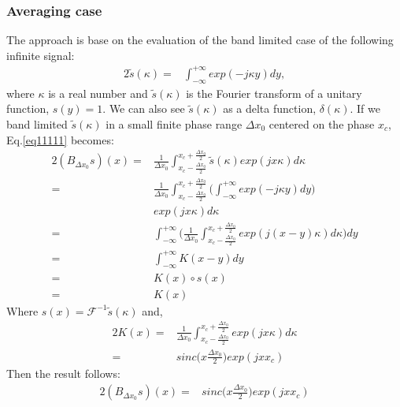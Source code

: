 \subsubsection{Averaging case}
The approach is base on the  evaluation of the band limited case of the following infinite signal:
\begin{alignat}{2}
\tilde{s}(\kappa) =& \int_{-\infty}^{+\infty}exp(-j\kappa y)dy, \label{eq11111}
\end{alignat}
where $\kappa$ is a real number and $\tilde{s}(\kappa)$ is the Fourier transform of a unitary function, $s(y)=1$. We can also see 
$\tilde{s}(\kappa)$ as a delta function, $\delta (\kappa)$.
If we band limited $\tilde{s}(\kappa)$ in a small finite phase range  $\Delta x_0$ centered on the phase $x_c$, Eq.\ref{eq11111} becomes:
\begin{alignat*}{2}
(B_{\Delta x_0}s)(x) =& \frac{1}{\Delta x_0}\int_{x_c-\frac{\Delta x_0}{2}}^{x_c+\frac{\Delta 
x_0}{2}}\tilde{s}(\kappa)exp(jx\kappa)d\kappa\label{eq1111111}\\
		     =& \frac{1}{\Delta x_0}\int_{x_c-\frac{\Delta x_0}{2}}^{x_c+\frac{\Delta x_0}{2}}\bigg( 
\int_{-\infty}^{+\infty}exp(-j\kappa y)dy\bigg)\\ 
		      & exp(jx\kappa)d\kappa\\
		     =&\int_{-\infty}^{+\infty}\bigg( \frac{1}{\Delta x_0} \int_{x_c-\frac{\Delta x_0}{2}}^{x_c+\frac{\Delta 
x_0}{2}}exp(j(x-y)\kappa)d\kappa\bigg)dy\\
		     =&\int_{-\infty}^{+\infty}K(x-y)dy\\
		     =& K(x)\circ s(x)\\
		     =&K(x)
\end{alignat*}
Where $s(x)=\mathcal{F}^{-1}\tilde{s}(\kappa)$ and,
\begin{alignat*}{2}
 K(x)=& \frac{1}{\Delta x_0} \int_{x_c-\frac{\Delta x_0}{2}}^{x_c+\frac{\Delta x_0}{2}}exp(jx\kappa )d\kappa\\
     =& sinc \big(x\frac{\Delta x_0}{2}\big) exp(jxx_c)
\end{alignat*}
Then the result follows:
\begin{alignat*}{2}
(B_{\Delta x_0}s)(x) = & sinc \big(x\frac{\Delta x_0}{2}\big) exp(jxx_c)
\end{alignat*}
